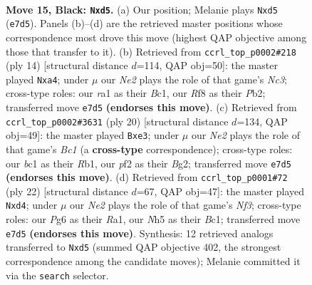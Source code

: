 \documentclass[11pt]{article}
\begin{document}
\clearpage

\begin{figure}[p]\centering
\begin{subfigure}{0.46\textwidth}\centering
\resizebox{\linewidth}{!}{%
\newchessgame
\chessboard[
  setfen={r1b2rk1/pp2n1bp/6p1/2pQpp1n/7P/4PNP1/PP1P1P2/RNB1RK1B b - - 0 15},
  showmover=false,
  pgfstyle=straightmove, color=movearrow, markmove={e7-d5}
]}
\caption{}
\end{subfigure}\hfill
\begin{subfigure}{0.46\textwidth}\centering
\resizebox{\linewidth}{!}{%
\newchessgame
\chessboard[
  setfen={rnb1k2r/pp2ppbp/5np1/2pp4/q1P5/2N2NP1/PP1PPPBP/R1B2RK1 w kq - 0 8},
  showmover=false,
  pgfstyle=straightmove, color=movearrow, markmove={c3-a4}
]}
\caption{}
\end{subfigure}
\\[4pt]
\begin{subfigure}{0.46\textwidth}\centering
\resizebox{\linewidth}{!}{%
\newchessgame
\chessboard[
  setfen={r1b1k2r/pp3pbp/n1pp1np1/8/2P5/2N1q1PN/PP2PPBP/1RB2RK1 w kq - 0 11},
  showmover=false,
  pgfstyle=straightmove, color=movearrow, markmove={c1-e3}
]}
\caption{}
\end{subfigure}\hfill
\begin{subfigure}{0.46\textwidth}\centering
\resizebox{\linewidth}{!}{%
\newchessgame
\chessboard[
  setfen={1n2k2r/rp2bppp/p1p1pnb1/8/3qP3/2NP1N2/PP2BPPP/R1B2RK1 w k - 0 12},
  showmover=false,
  pgfstyle=straightmove, color=movearrow, markmove={f3-d4}
]}
\caption{}
\end{subfigure}
\caption{\textbf{Move 15, Black: \texttt{Nxd5}.} (a) Our position; Melanie plays \texttt{Nxd5} (\texttt{e7d5}). Panels (b)--(d) are the retrieved master positions whose correspondence most drove this move (highest QAP objective among those that transfer to it). (b) Retrieved from \texttt{ccrl\_top\_p0002\#218} (ply 14) [structural distance $d$=114, QAP obj=50]: the master played \texttt{Nxa4}; under $\mu$ our \emph{Ne2} plays the role of that game's \emph{Nc3}; cross-type roles: our \emph{r}a1 as their \emph{B}c1, our \emph{R}f8 as their \emph{P}b2; transferred move \texttt{e7d5} \textbf{(endorses this move)}. (c) Retrieved from \texttt{ccrl\_top\_p0002\#3631} (ply 20) [structural distance $d$=134, QAP obj=49]: the master played \texttt{Bxe3}; under $\mu$ our \emph{Ne2} plays the role of that game's \emph{Bc1} (a \textbf{cross-type} correspondence); cross-type roles: our \emph{b}c1 as their \emph{R}b1, our \emph{p}f2 as their \emph{B}g2; transferred move \texttt{e7d5} \textbf{(endorses this move)}. (d) Retrieved from \texttt{ccrl\_top\_p0001\#72} (ply 22) [structural distance $d$=67, QAP obj=47]: the master played \texttt{Nxd4}; under $\mu$ our \emph{Ne2} plays the role of that game's \emph{Nf3}; cross-type roles: our \emph{P}g6 as their \emph{R}a1, our \emph{N}h5 as their \emph{B}c1; transferred move \texttt{e7d5} \textbf{(endorses this move)}. Synthesis: 12 retrieved analogs transferred to \texttt{Nxd5} (summed QAP objective 402, the strongest correspondence among the candidate moves); Melanie committed it via the \texttt{search} selector.}
\label{fig:thought-m29}
\end{figure}
\end{document}
